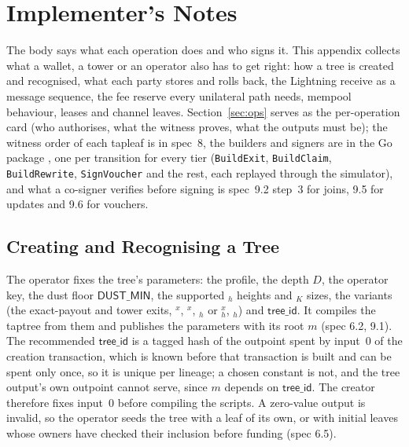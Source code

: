\section{Implementer's Notes}\label{app:impl}

The body says what each operation does and who signs it. This appendix
collects what a wallet, a tower or an operator also has to get right:
how a tree is created and recognised, what each party stores and rolls
back, the Lightning receive as a message sequence, the fee reserve every
unilateral path needs, mempool behaviour, leases and channel leaves.
Section~\ref{sec:ops} serves as the per-operation card (who authorises,
what the witness proves, what the outputs must be); the witness order of
each tapleaf is in spec~8, the builders and signers are in the Go
package , one per transition for every tier
(\texttt{BuildExit}, \texttt{BuildClaim}, \texttt{BuildRewrite},
\texttt{SignVoucher} and the rest, each replayed through the simulator), and what a co-signer verifies before signing is spec~9.2 step~3
for joins, 9.5 for updates and 9.6 for vouchers.

\subsection{Creating and Recognising a Tree}\label{app:impl-create}

The operator fixes the tree's parameters: the profile, the depth $D$,
the operator key, the dust floor $\mathsf{DUST\_MIN}$, the supported
$_h$ heights and $_K$ sizes, the variants (the
exact-payout and tower exits, $^{x}$, $^{x}$,
$_h$ or $_h^{x}$, $_h$) and
$\mathsf{tree\_id}$. It compiles the taptree from them and publishes the
parameters with its root $m$ (spec 6.2, 9.1). The recommended
$\mathsf{tree\_id}$ is a tagged hash of the outpoint spent by input~0 of
the creation transaction, which is known before that transaction is
built and can be spent only once, so it is unique per lineage; a chosen
constant is not, and the tree output's own outpoint cannot serve, since
$m$ depends on $\mathsf{tree\_id}$. The creator therefore fixes input~0
before compiling the scripts. A zero-value output is invalid, so the
operator seeds the tree with a leaf of its own, or with initial leaves
whose owners have checked their inclusion before funding (spec 6.5).

